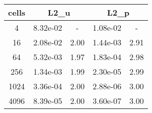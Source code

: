 \documentclass[10pt]{report}
\begin{document}
\begin{table}[H]
\begin{center}
\begin{tabular}{|c|c|c|c|c|} \hline
cells & 
\multicolumn{2}{|c|}{L2_u} & 
\multicolumn{2}{|c|}{L2_p}\\ \hline
4 & 8.32e-02 & - & 1.08e-02 & -\\ \hline
16 & 2.08e-02 & 2.00 & 1.44e-03 & 2.91\\ \hline
64 & 5.32e-03 & 1.97 & 1.83e-04 & 2.98\\ \hline
256 & 1.34e-03 & 1.99 & 2.30e-05 & 2.99\\ \hline
1024 & 3.36e-04 & 2.00 & 2.88e-06 & 3.00\\ \hline
4096 & 8.39e-05 & 2.00 & 3.60e-07 & 3.00\\ \hline
\end{tabular}
\end{center}
\end{table}
\end{document}
